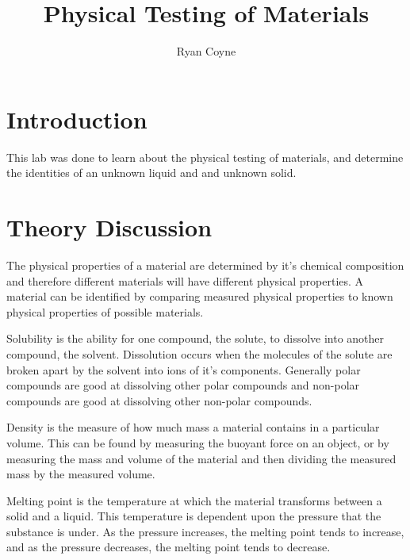 \documentclass[12pt]{article}
\begin{document}
    \title{Physical Testing of Materials}
    \author{Ryan Coyne}
    \maketitle
    \section*{Introduction}
        This lab was done to learn about the physical testing of materials, and determine the identities of an unknown liquid and and unknown solid.
    \section*{Theory Discussion}
        The physical properties of a material are determined by it's chemical composition and therefore different materials will have different physical properties. A material can be identified by comparing measured physical properties to known physical properties of possible materials. 

        Solubility is the ability for one compound, the solute, to dissolve into another compound, the solvent. Dissolution occurs when the molecules of the solute are broken apart by the solvent into ions of it's components. Generally polar compounds are good at dissolving other polar compounds and non-polar compounds are good at dissolving other non-polar compounds.

        Density is the measure of how much mass a material contains in a particular volume. This can be found by measuring the buoyant force on an object, or by measuring the mass and volume of the material and then dividing the measured mass by the measured volume.

        Melting point is the temperature at which the material transforms between a solid and a liquid. This temperature is dependent upon the pressure that the substance is under. As the pressure increases, the melting point tends to increase, and as the pressure decreases, the melting point tends to decrease.
\end{document}
